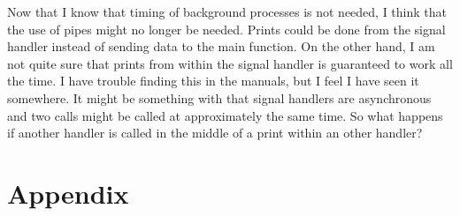 \documentclass{article}
\begin{document}
    Now that I know that timing of background processes is not needed, I think
    that the use of pipes might no longer be needed. Prints could be done from
    the signal handler instead of sending data to the main function. On the
    other hand, I am not quite sure that prints from within the signal handler
    is guaranteed to work all the time. I have trouble finding this in the
    manuals, but I feel I have seen it somewhere. It might be something with
    that signal handlers are asynchronous and two calls might be called at
    approximately the same time. So what happens if another handler is called
    in the middle of a print within an other handler?

\newpage
\section{Appendix}
    
    
    
\end{document}
